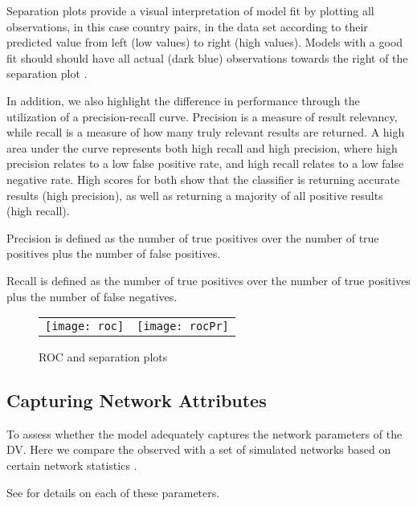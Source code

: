 Separation plots provide a visual interpretation of model fit by plotting all observations, in this case country pairs, in the data set according to their predicted value from left (low values) to right (high values). Models with a good fit should should have all actual (dark blue) observations towards the right of the separation plot \citep{greenhill:etal:2011}.

In addition, we also highlight the difference in performance through the utilization of a precision-recall curve. Precision is a measure of result relevancy, while recall is a measure of how many truly relevant results are returned. A high area under the curve represents both high recall and high precision, where high precision relates to a low false positive rate, and high recall relates to a low false negative rate. High scores for both show that the classifier is returning accurate results (high precision), as well as returning a majority of all positive results (high recall). 

Precision is defined as the number of true positives over the number of true positives plus the number of false positives. 

Recall is defined as the number of true positives over the number of true positives plus the number of false negatives. 

\begin{figure}[ht]
	\centering
	\begin{tabular}{cc}
	\texttt{[image: roc]} & 
	\texttt{[image: rocPr]}	
	\end{tabular}
	\caption{ROC and separation plots}
	\label{fig:roc}
\end{figure}
\FloatBarrier

\subsection{Capturing Network Attributes}

To assess whether the model adequately captures the network parameters of the DV. Here we compare the observed with a set of simulated networks based on certain network statistics \citep{hunter:etal:2008}. 

See \citet{morris:etal:2008} for details on each of these parameters. 

